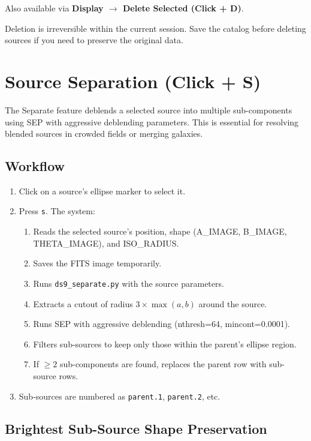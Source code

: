 \documentclass[11pt,fleqn]{book}
\begin{document}
Also available via \textbf{Display $\to$ Delete Selected (Click + D)}.

\begin{important}
Deletion is irreversible within the current session. Save the catalog before deleting sources if you need to preserve the original data.
\end{important}


\section{Source Separation (Click + S)}

The Separate feature deblends a selected source into multiple sub-components using SEP with aggressive deblending parameters. This is essential for resolving blended sources in crowded fields or merging galaxies.

\subsection{Workflow}

\begin{enumerate}[leftmargin=2em]
  \item Click on a source's ellipse marker to select it.
  \item Press \texttt{s}. The system:
  \begin{enumerate}
    \item Reads the selected source's position, shape (A\_IMAGE, B\_IMAGE, THETA\_IMAGE), and ISO\_RADIUS.
    \item Saves the FITS image temporarily.
    \item Runs \texttt{ds9\_separate.py} with the source parameters.
    \item Extracts a cutout of radius $3 \times \max(a, b)$ around the source.
    \item Runs SEP with aggressive deblending (nthresh=64, mincont=0.0001).
    \item Filters sub-sources to keep only those within the parent's ellipse region.
    \item If $\geq 2$ sub-components are found, replaces the parent row with sub-source rows.
  \end{enumerate}
  \item Sub-sources are numbered as \texttt{parent.1}, \texttt{parent.2}, etc.
\end{enumerate}

\subsection{Brightest Sub-Source Shape Preservation}
\end{document}
